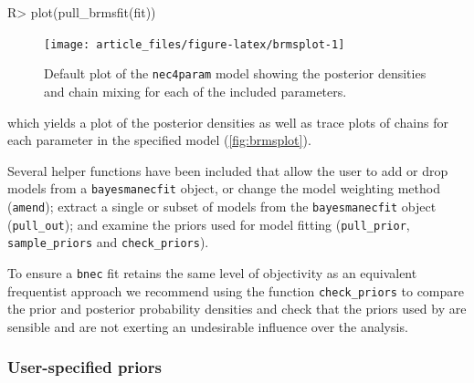 \documentclass[
  shortnames]{jss}
\begin{document}
\begin{CodeChunk}
\begin{CodeInput}
R> plot(pull_brmsfit(fit))
\end{CodeInput}
\begin{figure}[!ht]

{\centering \texttt{[image: article\_files/figure-latex/brmsplot-1]} 

}

\caption[Default  plot of the \texttt{nec4param} model showing the posterior densities and chain mixing for each of the included parameters]{Default  plot of the \texttt{nec4param} model showing the posterior densities and chain mixing for each of the included parameters.}\label{fig:brmsplot}
\end{figure}
\end{CodeChunk}

which yields a plot of the posterior densities as well as trace plots of chains for each parameter in the specified model (\autoref{fig:brmsplot}).

Several helper functions have been included that allow the user to add or drop models from a \texttt{bayesmanecfit} object, or change the model weighting method (\texttt{amend}); extract a single or subset of models from the \texttt{bayesmanecfit} object (\texttt{pull\_out}); and examine the priors used for model fitting (\texttt{pull\_prior}, \texttt{sample\_priors} and \texttt{check\_priors}).

To ensure a \texttt{bnec} fit retains the same level of objectivity as an equivalent frequentist approach we recommend using the function \texttt{check\_priors} to compare the prior and posterior probability densities and check that the priors used by  are sensible and are not exerting an undesirable influence over the analysis.

\hypertarget{user-specified-priors}{%
\subsubsection{User-specified priors}\label{user-specified-priors}}
\end{document}
